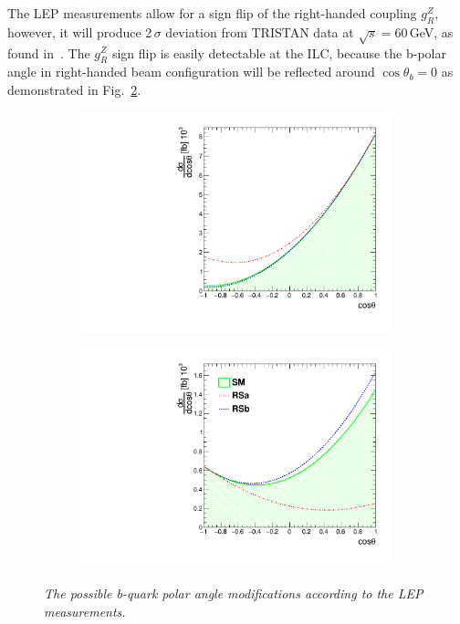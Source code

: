The LEP measurements allow for a sign flip of the right-handed coupling $g_R^Z$, however, it will produce 2\,$\sigma$ deviation from TRISTAN data at $\sqrt{s}=60$\,GeV, as found in~\cite{bib:RSTOP}.
The $g_R^Z$ sign flip is easily detectable at the ILC, because the b-polar angle in right-handed beam configuration will be reflected around $\cos\theta_b = 0$ as demonstrated in Fig.~\ref{fig:dsResult_b_3}. 
\begin{figure}
	\centering
	\begin{subfigure}{0.5\textwidth}
		\includegraphics[width=0.99\textwidth]{ILD/plots/ds-left.pdf}
		\caption{\label{fig:dsResult_a_3} }
	\end{subfigure}%
	\begin{subfigure}{0.5\textwidth}
		\centering
		\includegraphics[width=0.99\textwidth]{ILD/plots/ds-right.pdf}
		\caption{\label{fig:dsResult_b_3} }
	\end{subfigure}
	\caption{\sl The possible b-quark polar angle modifications according to the LEP measurements. }
	\label{fig:dsResult_3}
\end{figure}

